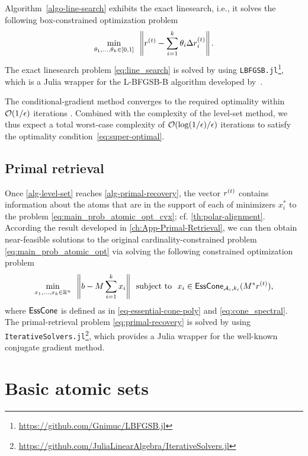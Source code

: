 Algorithm~\ref{algo-line-search} exhibits the exact linesearch, i.e., it solves the following box-constrained optimization problem
\begin{equation} \label{eq:line_search}
  \min_{\theta_1, \dots, \theta_k \in [0,1]} \enspace \left\|r^{(t)} - \sum_{i=1}^k \theta_i\Delta r_i^{(t)}\right\|.
\end{equation}
The exact linesearch problem \eqref{eq:line_search} is solved by using \texttt{LBFGSB.jl}\footnote{\url{https://github.com/Gnimuc/LBFGSB.jl}}, which is a Julia wrapper for the L-BFGSB-B algorithm developed by~\citet{zhu1997algorithm}. 

The conditional-gradient method converges to the required optimality within $\mathcal{O}(1/\epsilon)$ iterations \cite{jaggi2013revisiting}. Combined with the complexity of the level-set method, we thus expect a total worst-case complexity of $\mathcal{O}(\log(1/\epsilon)/\epsilon)$ iterations to satisfy the optimality condition~\eqref{eq:super-optimal}.

\subsection{Primal retrieval} \label{sec:primal_retrieval}
Once \autoref{alg-level-set} reaches \autoref{alg-primal-recovery}, the vector $r^{(t)}$ contains information about the atoms that are in the support of each of minimizers $x_i^*$ to the problem \eqref{eq:main_prob_atomic_opt_cvx}; cf. \autoref{th:polar-alignment}. According the result developed in \autoref{ch:App-Primal-Retrieval}, we can then obtain near-feasible solutions to the original cardinality-constrained problem \eqref{eq:main_prob_atomic_opt} via solving the following constrained optimization problem
\begin{equation} \label{eq:primal-recovery}
  \min_{x_1, \dots, x_k \in \mathbb{R}^n} \enspace \left\|b - M\sum_{i=1}^k x_i\right\| \enspace\mathop{\hbox{\rm subject to}}\enspace x_i \in \operatorname{\sf EssCone}_{\mathcal{A}_i, k_i}(M^*r^{(t)}),
\end{equation}
where $\operatorname{\sf EssCone}$ is defined as in \eqref{eq-essential-cone-poly} and \eqref{eq:cone_spectral}. The primal-retrieval problem \eqref{eq:primal-recovery} is solved by using \texttt{IterativeSolvers.jl}\footnote{\url{https://github.com/JuliaLinearAlgebra/IterativeSolvers.jl}}, which provides a Julia wrapper for the well-known conjugate gradient method.  



\section{Basic atomic sets} \label{sec:5-3}

